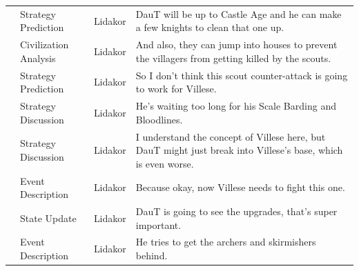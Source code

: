 {\begin{longtable}{@{}>{\theAppRow}r|L{2.3cm}L{1.0cm}U{11.55cm}@{}}
    & Strategy Prediction   & Lidakor & DauT will be up to Castle Age and he can make a few knights to clean that one up.                                                                                                                                                                                                               \\
    & Civilization Analysis & Lidakor & And also, they can jump into houses to prevent the villagers from getting killed by the scouts.                                                                                                                                                                                                 \\
    & Strategy Prediction   & Lidakor & So I don't think this scout counter-attack is going to work for Villese.                                                                                                                                                                                                                        \\
    & Strategy Discussion   & Lidakor & He's waiting too long for his Scale Barding and Bloodlines.                                                                                                                                                                                                                                     \\
    & Strategy Discussion   & Lidakor & I understand the concept of Villese here, but DauT might just break into Villese's base, which is even worse.                                                                                                                                                                                   \\
    & Event Description     & Lidakor & Because okay, now Villese needs to fight this one.                                                                                                                                                                                                                                              \\
    & State Update          & Lidakor & DauT is going to see the upgrades, that's super important.                                                                                                                                                                                                                                      \\
    & Event Description     & Lidakor & He tries to get the archers and skirmishers behind.                                                                                                                                                                                                                                             \\

\end{longtable}}
